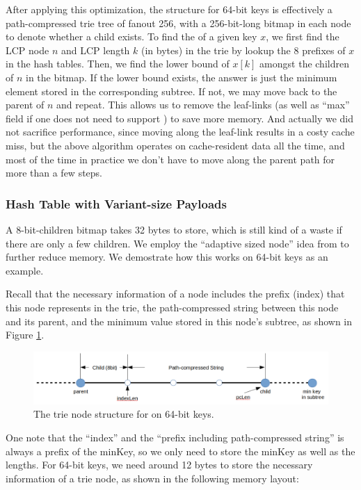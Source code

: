 \documentclass[11pt, usletter]{article}
\begin{document}
After applying this optimization, the \MlpIndex structure for 64-bit keys is effectively 
a path-compressed trie tree of fanout 256, with a 256-bit-long bitmap in each node to denote whether a child exists. 
To find the \lowerbound of a given key $x$, we first find the LCP node $n$ and LCP length $k$ (in bytes) in the trie 
by lookup the 8 prefixes of $x$ in the hash tables. 
Then, we find the lower bound of $x[k]$ amongst the children of $n$ in the bitmap. 
If the lower bound exists, the answer is just the minimum element stored in the corresponding subtree.
If not, we may move back to the parent of $n$ and repeat. 
This allows us to remove the leaf-links (as well as ``max'' field if one does not need to support \upperbound) to save more memory. 
And actually we did not sacrifice performance, since moving along the leaf-link results in a costy cache miss, 
but the above algorithm operates on cache-resident data all the time, and most of the time in practice 
we don't have to move along the parent path for more than a few steps.

\subsubsection*{Hash Table with Variant-size Payloads}

A 8-bit-children bitmap takes 32 bytes to store, which is still kind of a waste if there are only a few children. 
We employ the ``adaptive sized node'' idea from \cite{arttrie_icde13} to further reduce memory. 
We demostrate how this works on 64-bit keys as an example. 

Recall that the necessary information of a node includes the prefix (index) that this node represents in the trie, 
the path-compressed string between this node and its parent, and the minimum value stored in this node's subtree, 
as shown in Figure \ref{mlpindex64_node}.

\begin{figure}[!htb]
  \includegraphics[width=\linewidth]{mlpindex64_node.png}
\caption{The trie node structure for \MlpIndex on 64-bit keys.}
\label{mlpindex64_node}
\end{figure}

One note that the ``index'' and the ``prefix including path-compressed string'' is always a prefix of the minKey, 
so we only need to store the minKey as well as the lengths. 
For 64-bit keys, we need around 12 bytes to store the necessary information of a trie node, 
as shown in the following memory layout:
\end{document}
